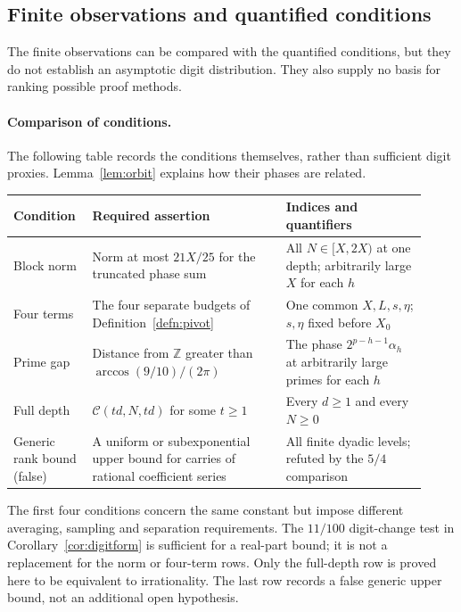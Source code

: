 \documentclass[11pt]{article}
\theoremstyle{plain}
\theoremstyle{definition}
\theoremstyle{remark}
\newcommand{\Z}{\mathbb{Z}}
\begin{document}
\subsection{Finite observations and quantified conditions}\label{sub:shape}

The finite observations can be compared with the quantified
conditions, but they do not establish an asymptotic digit distribution.
They also supply no basis for ranking possible proof methods.

\paragraph{Comparison of conditions.}
The following table records the conditions themselves, rather than
sufficient digit proxies. Lemma~\ref{lem:orbit} explains how their phases
are related.

\begin{center}
\setlength{\tabcolsep}{5pt}
\begin{tabular}{>{\raggedright\arraybackslash}p{0.16\linewidth} >{\raggedright\arraybackslash}p{0.44\linewidth} >{\raggedright\arraybackslash}p{0.32\linewidth}}
\hline
Condition & Required assertion & Indices and quantifiers \\
\hline
Block norm & Norm at most $21X/25$ for the truncated phase sum &
All $N\in[X,2X)$ at one depth; arbitrarily large $X$ for each $h$ \\
Four terms & The four separate budgets of Definition~\ref{defn:pivot} &
One common $X,L,s,\eta$; $s,\eta$ fixed before $X_0$ \\
Prime gap & Distance from $\Z$ greater than $\arccos(9/10)/(2\pi)$ &
The phase $2^{p-h-1}\alpha_h$ at arbitrarily large primes for each $h$ \\
Full depth & $\mathcal C(td,N,td)$ for some $t\ge1$ &
Every $d\ge1$ and every $N\ge0$ \\
Generic rank bound (false) & A uniform or subexponential upper bound for carries of rational coefficient series &
All finite dyadic levels; refuted by the $5/4$ comparison \\
\hline
\end{tabular}
\end{center}

\noindent
The first four conditions concern the same constant but impose different
averaging, sampling and separation requirements. The $11/100$ digit-change
test in Corollary~\ref{cor:digitform} is sufficient for a real-part bound;
it is not a replacement for the norm or four-term rows. Only the full-depth
row is proved here to be equivalent to irrationality. The last row records
a false generic upper bound, not an additional open hypothesis.
\end{document}

